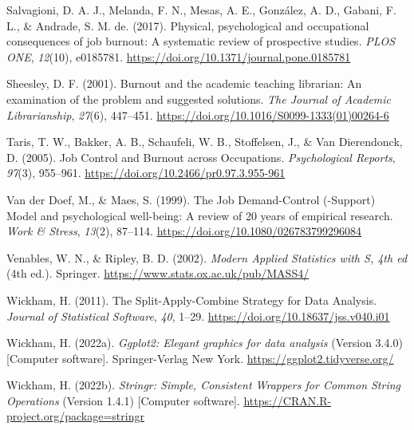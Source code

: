 \documentclass[
  twocolumn]{article}
\newlength{\cslhangindent}
\newenvironment{CSLReferences}[2] %
 {\begin{list}{}{%
  \setlength{\itemindent}{0pt}
  \setlength{\leftmargin}{0pt}
  \setlength{\parsep}{0pt}
  \ifodd #1
   \setlength{\leftmargin}{\cslhangindent}
   \setlength{\itemindent}{-1\cslhangindent}
  \fi
  \setlength{\itemsep}{#2\baselineskip}}}
 {\end{list}}
\begin{document}
\begin{CSLReferences}{1}{0}
Salvagioni, D. A. J., Melanda, F. N., Mesas, A. E., González, A. D.,
Gabani, F. L., \& Andrade, S. M. de. (2017). Physical, psychological and
occupational consequences of job burnout: {A} systematic review of
prospective studies. \emph{PLOS ONE}, \emph{12}(10), e0185781.
\url{https://doi.org/10.1371/journal.pone.0185781}

Sheesley, D. F. (2001). Burnout and the academic teaching librarian:
{An} examination of the problem and suggested solutions. \emph{The
Journal of Academic Librarianship}, \emph{27}(6), 447--451.
\url{https://doi.org/10.1016/S0099-1333(01)00264-6}

Taris, T. W., Bakker, A. B., Schaufeli, W. B., Stoffelsen, J., \& Van
Dierendonck, D. (2005). Job {Control} and {Burnout} across
{Occupations}. \emph{Psychological Reports}, \emph{97}(3), 955--961.
\url{https://doi.org/10.2466/pr0.97.3.955-961}

Van der Doef, M., \& Maes, S. (1999). The {Job Demand-Control}
(-{Support}) {Model} and psychological well-being: {A} review of 20
years of empirical research. \emph{Work \& Stress}, \emph{13}(2),
87--114. \url{https://doi.org/10.1080/026783799296084}

Venables, W. N., \& Ripley, B. D. (2002). \emph{Modern {Applied
Statistics} with {S}, 4th ed} (4th ed.). {Springer}.
\url{https://www.stats.ox.ac.uk/pub/MASS4/}

Wickham, H. (2011). The {Split-Apply-Combine Strategy} for {Data
Analysis}. \emph{Journal of Statistical Software}, \emph{40}, 1--29.
\url{https://doi.org/10.18637/jss.v040.i01}

Wickham, H. (2022a). \emph{Ggplot2: {Elegant} graphics for data
analysis} (Version 3.4.0) {[}Computer software{]}. {Springer-Verlag New
York}. \url{https://ggplot2.tidyverse.org/}

Wickham, H. (2022b). \emph{Stringr: {Simple}, {Consistent Wrappers} for
{Common String Operations}} (Version 1.4.1) {[}Computer software{]}.
\url{https://CRAN.R-project.org/package=stringr}


\end{CSLReferences}
\end{document}
